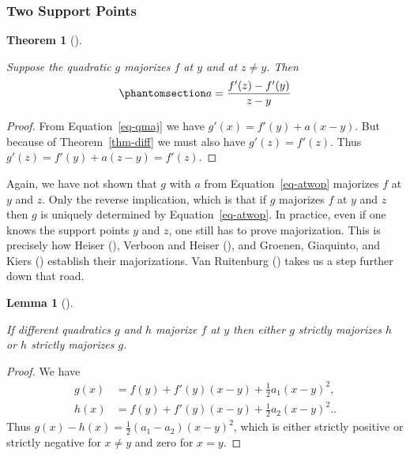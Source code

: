 \documentclass[
  12pt,
  letterpaper,
  DIV=11,
  numbers=noendperiod]{scrartcl}
\theoremstyle{definition}
\theoremstyle{plain}
\newtheorem{theorem}{Theorem}[section]
\theoremstyle{plain}
\newtheorem{lemma}{Lemma}[section]
\theoremstyle{remark}
\begin{document}
\subsubsection{Two Support Points}\label{sec-twosupport}

\begin{theorem}[]\protect\hypertarget{thm-twop}{}\label{thm-twop}

Suppose the quadratic \(g\) majorizes \(f\) at \(y\) and at
\(z\not= y\). Then \begin{equation}\phantomsection\label{eq-atwop}{
a=\frac{f'(z)-f'(y)}{z-y}
}\end{equation}

\end{theorem}

\begin{proof}
From Equation~\ref{eq-qmaj} we have \(g'(x)=f'(y)+a(x-y)\). But because
of Theorem~\ref{thm-diff} we must also have \(g'(z)=f'(z)\). Thus
\(g'(z)=f'(y)+a(z-y)=f'(z)\).
\end{proof}

Again, we have not shown that \(g\) with \(a\) from
Equation~\ref{eq-atwop} majorizes \(f\) at \(y\) and \(z\). Only the
reverse implication, which is that if \(g\) majorizes \(f\) at \(y\) and
\(z\) then \(g\) is uniquely determined by Equation~\ref{eq-atwop}. In
practice, even if one knows the support points \(y\) and \(z\), one
still has to prove majorization. This is precisely how Heiser
(), Verboon and Heiser
(), and Groenen, Giaquinto, and
Kiers () establish their
majorizations. Van Ruitenburg ()
takes us a step further down that road.

\begin{lemma}[]\protect\hypertarget{lem-fan}{}\label{lem-fan}

If different quadratics \(g\) and \(h\) majorize \(f\) at \(y\) then
either \(g\) strictly majorizes \(h\) or \(h\) strictly majorizes \(g\).

\end{lemma}

\begin{proof}
We have \begin{subequations}
\begin{align}
g(x)&=f(y)+f'(y)(x-y)+\frac12a_1(x-y)^2,\label{eq-gfunc}\\
h(x)&=f(y)+f'(y)(x-y)+\frac12a_2(x-y)^2.\label{eq-hfunc}.
\end{align}
\end{subequations} Thus \(g(x)-h(x)=\frac12(a_1-a_2)(x-y)^2\), which is
either strictly positive or strictly negative for \(x\not= y\) and zero
for \(x=y\).
\end{proof}
\end{document}
